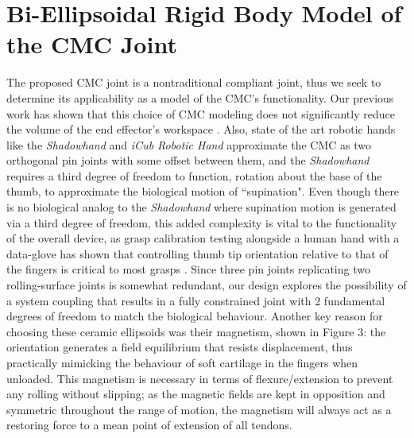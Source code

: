 \documentclass[letterpaper, 10 pt, conference]{ieeeconf}
\begin{document}
\section{Bi-Ellipsoidal Rigid Body Model of the CMC Joint}
The proposed CMC joint is a nontraditional compliant joint, thus we seek to determine its applicability as a model of the CMC's functionality. Our previous work has shown that this choice of CMC modeling does not significantly reduce the volume of the end effector's workspace \cite{biorob}. Also, state of the art robotic hands like the \textit{Shadowhand} and \textit{iCub Robotic Hand} approximate the CMC as two orthogonal pin joints with some offset between them, and the \textit{Shadowhand} requires a third degree of freedom to function, rotation about the base of the thumb, to approximate the biological motion of ``supination". Even though there is no biological analog to the \textit{Shadowhand} where supination motion is generated via a third degree of freedom, this added complexity is vital to the functionality of the overall device, as grasp calibration testing alongside a human hand with a data-glove has shown that controlling thumb tip orientation relative to that of the fingers is critical to most grasps \cite{kingcakebaby}. Since three pin joints replicating two rolling-surface joints is somewhat redundant, our design explores the possibility of a system coupling that results in a fully constrained joint with 2 fundamental degrees of freedom to match the biological behaviour. Another key reason for choosing these ceramic ellipsoids was their magnetism, shown in Figure 3: the orientation generates a field equilibrium that resists displacement, thus practically mimicking the behaviour of soft cartilage in the fingers when unloaded. This magnetism is necessary in terms of flexure/extension to prevent any rolling without slipping; as the magnetic fields are kept in opposition and symmetric throughout the range of motion, the magnetism will always act as a restoring force to a mean point of extension of all tendons. 
\end{document}

